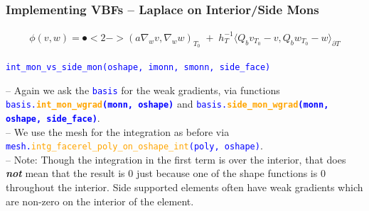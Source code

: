 \documentclass[compress]{beamer}
\begin{document}
\begin{frame}
  \frametitle{Implementing VBFs -- Laplace on Interior/Side Mons}
  \vspace{-1.38cm}
  \begin{align*}
    \mathfrak \phi(v,w) = \spot<2->{(a \nabla_w v,\nabla_w w)_{\scriptscriptstyle T_0}} \;+\;
    h_T^{-1}\langle Q_b v_{\scriptscriptstyle T_0} - v,Q_b w_{\scriptscriptstyle T_0} - w \rangle_{\partial T}
  \end{align*}
  
  \texttt{\small \textcolor{blue}{int\_mon\_vs\_side\_mon(oshape, imonn, smonn, side\_face)}}\\
  \vspace{.3cm}
  
  \pause
  \uncover<+-> {
  -- Again we ask the \texttt{\textcolor{blue}{basis}} for the weak gradients,
     via functions {\small \texttt{\textcolor{blue}{basis.\textbf{\textcolor{orange}{int\_mon\_wgrad}(monn, oshape)}}}} and
     {\small \texttt{\textcolor{blue}{basis.\textbf{\textcolor{orange}{side\_mon\_wgrad}(monn, oshape, side\_face)}}}}.\\
  -- We use the mesh for the integration as before via
     \texttt{\small \textcolor{blue}{mesh.\textcolor{orange}{intg\_facerel\_poly\_on\_oshape\_int}(poly, oshape)}}.\\
  
  \vspace{.3cm}
  \uncover<+-> {
  -- Note: Though the integration in the first term is over the interior, that does \emph{\textbf{not}} mean that the result
  is 0 just because one of the shape functions is 0 throughout the interior. Side supported elements often have weak gradients
  which are non-zero on the interior of the element.
  }}
\end{frame}
\end{document}

